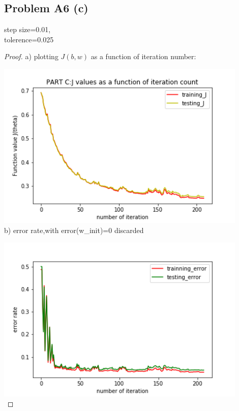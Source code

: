 \documentclass[12pt]{article}
\begin{document}
\subsection*{Problem A6 (c)}
step size=0.01, \\tolerence=0.025
\begin{proof}
 a) plotting $J(b,w)$ as a function of iteration number:

\includegraphics[width = 12cm, height = 8cm]{../code/A6_c_1.png}\\

b) error rate,with error(w\_init)=0 discarded  

\includegraphics[width = 12cm, height = 8cm]{../code/A6_c_2.png}\\
       
               
 
\end{proof}
\newpage
\end{document}
